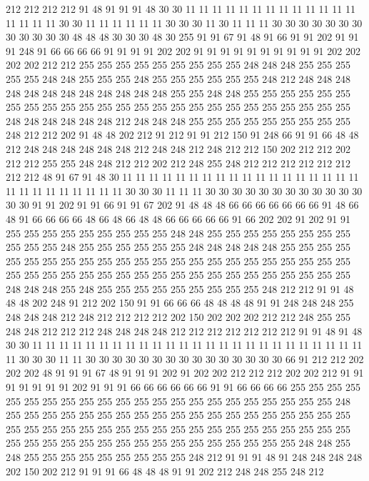 212 212 212 212 91 48 91 91 91 48 30 30 11 11 11 11 11 11 11 11
11 11 11 11 11 11 11 11 11 30 30 11 11 11 11 11 11 30 30 30
11 30 11 11 11 30 30 30 30 30 30 30 30 30 30 30 30 48 48 48
30 30 30 48 30 255 91 91 67 91 48 91 66 91 91 202 91 91 91 248
91 66 66 66 66 91 91 91 91 202 202 91 91 91 91 91 91 91 91 91
91 202 202 202 202 212 212 255 255 255 255 255 255 255 255 255 248 248 248 255
255 255 255 255 248 248 255 255 255 248 255 255 255 255 255 255 248 212 248 248
248 248 248 248 248 248 248 248 248 248 255 255 248 248 255 255 255 255 255 255
255 255 255 255 255 255 255 255 255 255 255 255 255 255 255 255 255 255 255 248
248 248 248 248 248 212 248 248 248 255 255 255 255 255 255 255 255 255 248 212
212 202 91 48 48 202 212 91 212 91 91 212 150 91 248 66 91 91 66 48
48 212 248 248 248 248 248 248 212 248 248 212 248 212 212 150 202 212 212 202
212 212 255 255 248 248 212 212 202 212 248 255 248 212 212 212 212 212 212 212
212 48 91 67 91 48 30 11 11 11 11 11 11 11 11 11 11 11 11 11
11 11 11 11 11 11 11 11 11 11 11 11 11 11 30 30 30 11 11 11
30 30 30 30 30 30 30 30 30 30 30 30 30 30 91 91 202 91 91 66
91 91 67 202 91 48 48 48 66 66 66 66 66 66 66 91 48 66 48 91
66 66 66 66 48 66 48 66 48 48 66 66 66 66 66 91 66 202 202 91
202 91 91 255 255 255 255 255 255 255 255 255 248 248 255 255 255 255 255 255
255 255 255 255 255 248 255 255 255 255 255 255 248 248 248 248 248 255 255 255
255 255 255 255 255 255 255 255 255 255 255 255 255 255 255 255 255 255 255 255
255 255 255 255 255 255 255 255 255 255 255 255 255 255 255 255 255 255 255 248
248 248 255 248 255 255 255 255 255 255 255 255 255 248 212 212 91 91 48 48
48 202 248 91 212 202 150 91 91 66 66 66 48 48 48 48 91 91 248 248
248 255 248 248 248 212 248 212 212 212 212 202 150 202 202 202 212 212 248 255
255 248 248 212 212 212 248 248 248 248 212 212 212 212 212 212 212 91 91 48
91 48 30 30 11 11 11 11 11 11 11 11 11 11 11 11 11 11 11 11
11 11 11 11 11 11 11 11 11 11 30 30 30 11 11 30 30 30 30 30
30 30 30 30 30 30 30 30 30 30 66 91 212 212 202 202 202 48 91 91
91 67 48 91 91 91 202 91 202 202 212 212 212 202 202 212 91 91 91 91
91 91 91 202 91 91 91 66 66 66 66 66 66 91 91 66 66 66 66 255
255 255 255 255 255 255 255 255 255 255 255 255 255 255 255 255 255 255 255 255
255 248 255 255 255 255 255 255 255 255 255 255 255 255 255 255 255 255 255 255
255 255 255 255 255 255 255 255 255 255 255 255 255 255 255 255 255 255 255 255
255 255 255 255 255 255 255 255 255 255 255 255 255 255 255 255 248 248 255 248
255 255 255 255 255 255 255 255 255 248 212 91 91 91 48 91 248 248 248 248
202 150 202 212 91 91 91 66 48 48 48 91 91 202 212 248 248 255 248 212
